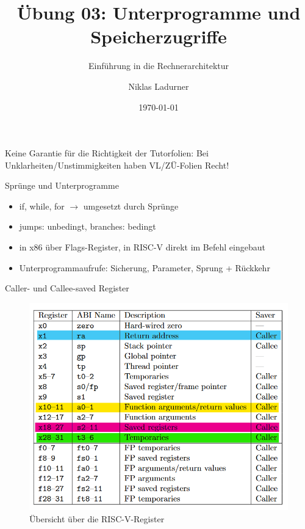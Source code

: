 \documentclass[
  german,            %
  aspectratio=169,    %
]{tumbeamer}
\title{Übung 03: Unterprogramme und \\ Speicherzugriffe}
\subtitle{Einführung in die Rechnerarchitektur}
\author{Niklas Ladurner}
\institute{\theChairName\\\theDepartmentName\\\theUniversityName}
\date[\today]{\today}
\begin{document}
\maketitle

\begin{frame}[c]{}{}
  \begin{center}
    \LARGE  Keine Garantie für die Richtigkeit der Tutorfolien: Bei Unklarheiten/Unstimmigkeiten 
    haben VL/ZÜ-Folien Recht!
  \end{center}
\end{frame}

\begin{frame}[c]{Sprünge und Unterprogramme}{}
  \begin{itemize}
    \item if, while, for $\rightarrow$ umgesetzt durch Sprünge
    \item jumps: unbedingt, branches: bedingt
    \item in x86 über Flags-Register, in RISC-V direkt im Befehl eingebaut
    \item Unterprogrammaufrufe: Sicherung, Parameter, Sprung + Rückkehr
  \end{itemize}
\end{frame}

\begin{frame}[c]{Caller- und Callee-saved Register}{}
  \begin{figure}[h]
  \includegraphics[height=0.75\textheight]{resources/w03_calling_conv_regs.png}
  \caption{Übersicht über die RISC-V-Register}
  \end{figure}
\end{frame}
\end{document}
